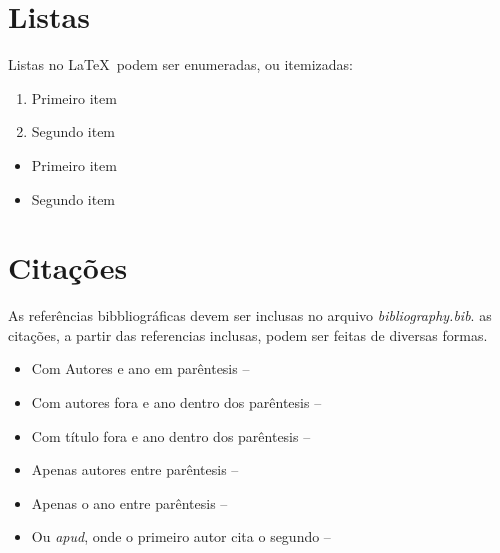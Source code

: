 
\section{Listas}
\label{sec:listas}

    Listas no \LaTeX\ podem ser enumeradas, ou itemizadas:


    \begin{enumerate}
        \item Primeiro item
        \item Segundo item
    \end{enumerate}


    \begin{itemize}
        \item Primeiro item
        \item Segundo item
    \end{itemize}


\section{Citações}

    As referências bibbliográficas devem ser inclusas no arquivo \textit{bibliography.bib}.
    as citações, a partir das referencias inclusas, podem ser feitas de diversas formas.


    \begin{itemize}
        \item Com Autores e ano em parêntesis -- \cite{wortmann2015internet}
        \item Com autores fora e ano dentro dos parêntesis -- \textcite{weber2010internet}
        \item Com título fora e ano dentro dos parêntesis -- 
        \item Apenas autores entre parêntesis -- \citeauthor{ashton2009internet}
        \item Apenas o ano entre parêntesis -- \citeyear{yoo2010research}
        \item Ou \textit{apud}, onde o primeiro autor cita o segundo -- 
    \end{itemize}

